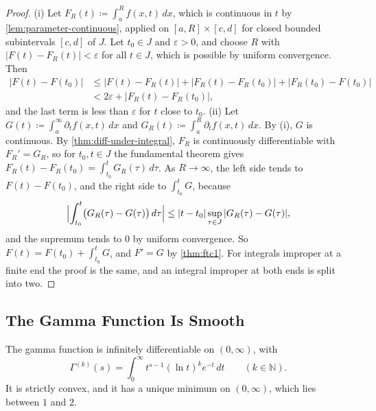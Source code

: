 \begin{proof}
(i) Let $F_R(t)\coloneqq\int_a^Rf(x,t)\,dx$, which is continuous in $t$ by \cref{lem:parameter-continuous}, applied on $[a,R]\times[c,d]$ for closed bounded subintervals $[c,d]$ of $J$. Let $t_0\in J$ and $\varepsilon>0$, and choose $R$ with $|F(t)-F_R(t)|<\varepsilon$ for all $t\in J$, which is possible by uniform convergence. Then
\[
\begin{aligned}
|F(t)-F(t_0)|&\le|F(t)-F_R(t)|+|F_R(t)-F_R(t_0)|+|F_R(t_0)-F(t_0)|\\
&<2\varepsilon+|F_R(t)-F_R(t_0)|,
\end{aligned}
\]
and the last term is less than $\varepsilon$ for $t$ close to $t_0$. (ii) Let $G(t)\coloneqq\int_a^\infty\partial_tf(x,t)\,dx$ and $G_R(t)\coloneqq\int_a^R\partial_tf(x,t)\,dx$. By (i), $G$ is continuous. By \cref{thm:diff-under-integral}, $F_R$ is continuously differentiable with $F_R'=G_R$, so for $t_0,t\in J$ the fundamental theorem gives $F_R(t)-F_R(t_0)=\int_{t_0}^tG_R(\tau)\,d\tau$. As $R\to\infty$, the left side tends to $F(t)-F(t_0)$, and the right side to $\int_{t_0}^tG$, because
\[
\Bigl|\int_{t_0}^t\bigl(G_R(\tau)-G(\tau)\bigr)\,d\tau\Bigr|\le|t-t_0|\sup_{\tau\in J}|G_R(\tau)-G(\tau)| ,
\]
and the supremum tends to $0$ by uniform convergence. So $F(t)=F(t_0)+\int_{t_0}^tG$, and $F'=G$ by \cref{thm:ftc1}. For integrals improper at a finite end the proof is the same, and an integral improper at both ends is split into two.
\end{proof}

\subsection{The Gamma Function Is Smooth}

\begin{proposition}
\label{prop:gamma-smooth}
The gamma function is infinitely differentiable on $(0,\infty)$, with
\[
\Gamma^{(k)}(s)=\int_0^\infty t^{s-1}(\ln t)^ke^{-t}\,dt\qquad(k\in\mathbb N).
\]
It is strictly convex, and it has a unique minimum on $(0,\infty)$, which lies between $1$ and $2$.
\end{proposition}

